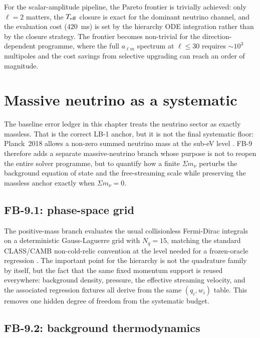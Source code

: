 For the scalar-amplitude pipeline, the Pareto frontier is
trivially achieved: only $\ell = 2$ matters, the
$T_{\mathrm{eff}}$ closure is exact for the dominant neutrino
channel, and the evaluation cost ($420$~ms) is set by
the hierarchy ODE integration rather than by the
closure strategy.  The frontier becomes non-trivial for
the direction-dependent programme, where the full
$a_{\ell m}$ spectrum at $\ell \leq 30$ requires
$\sim\!10^3$ multipoles and the cost savings from
selective upgrading can reach an order of magnitude.


\section{Massive neutrino as a systematic}
\label{sec:massive-neutrino-systematic}

The baseline error ledger in this chapter treats the neutrino sector as
exactly massless.  That is the correct LB-1 anchor, but it is not the
final systematic floor: Planck~2018 allows a non-zero summed neutrino
mass at the sub-eV level \cite{Planck2018VI}.  FB-9 therefore adds a
separate massive-neutrino branch whose purpose is not to reopen the
entire solver programme, but to quantify how a finite
$\Sigma m_\nu$ perturbs the background equation of state and the
free-streaming scale while preserving the massless anchor exactly when
$\Sigma m_\nu = 0$.

\subsection{FB-9.1: phase-space grid}

The positive-mass branch evaluates the usual collisionless Fermi-Dirac
integrals on a deterministic Gauss-Laguerre grid with $N_q = 15$,
matching the standard CLASS/CAMB non-cold-relic convention at the level
needed for a frozen-oracle regression \cite{LesgourguesTram2011}.  The
important point for the hierarchy is not the quadrature family by
itself, but the fact that the same fixed momentum support is reused
everywhere: background density, pressure, the effective streaming
velocity, and the associated regression fixtures all derive from the
same $(q_i, w_i)$ table.  This removes one hidden degree of freedom from
the systematic budget.

\subsection{FB-9.2: background thermodynamics}

